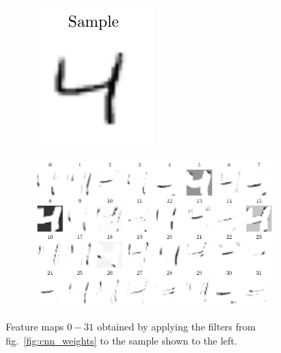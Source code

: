 \documentclass[11pt,a4paper]{scrartcl}
\begin{document}
\begin{figure}[ht]
    \centering
    \begin{subfigure}[c]{0.3\textwidth}
        \includegraphics[width=\textwidth]{../02_Classification/Plots/feature_maps_cnn_sample}
    \end{subfigure}%
    \begin{subfigure}[c]{0.7\textwidth}
        \includegraphics[width=\textwidth]{../02_Classification/Plots/feature_maps_cnn}
    \end{subfigure}
    \caption{Feature maps $0-31$ obtained by applying the filters from fig.~\ref{fig:cnn_weights} to the sample shown to the left. \label{fig:cnn_features}}
\end{figure}
\end{document}
